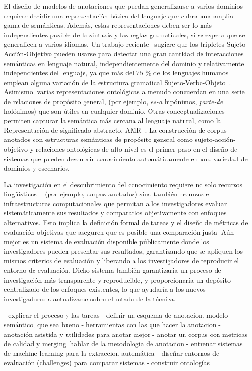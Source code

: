El diseño de modelos de anotaciones que puedan generalizarse a varios dominios requiere decidir una representación básica del lenguaje que cubra una amplia gama de semánticas.
Además, estas representaciones deben ser lo más independientes posible de la sintaxis y las reglas gramaticales, si se espera que se generalicen a varios idiomas.
Un trabajo reciente~\cite{estevez2018gathering} sugiere que los tripletes Sujeto-Acción-Objetivo pueden usarse para detectar una gran cantidad de interacciones semánticas en lenguaje natural, independientemente del dominio y relativamente independientes del lenguaje, ya que
más del 75 \% de los lenguajes humanos emplean alguna variación de la estructura gramatical Sujeto-Verbo-Objeto~\cite{crystal2004cambridge}.
Asimismo, varias representaciones ontológicas a menudo concuerdan en una serie de relaciones de propósito general, (por ejemplo, \textit{es-a} hipónimos, \textit{parte-de} holónimos) que son útiles en cualquier dominio.
Otras conceptualizaciones permiten capturar la semántica más cercana al lenguaje natural, como la Representación de significado abstracto, AMR~\cite{banarescu2013abstract}.
La construcción de corpus anotados con estructuras semánticas de propósito general como sujeto-acción-objetivo y relaciones ontológicas de alto nivel es el primer paso en el diseño de sistemas que pueden descubrir conocimiento automáticamente en una variedad de dominios y escenarios.

La investigación en el descubrimiento del conocimiento requiere no solo recursos lingüísticos ~ (por ejemplo, corpus anotados) sino también recursos e infraestructuras computacionales que permitan a los investigadores evaluar sistemáticamente sus resultados y compararlos objetivamente con enfoques alternativos.
Esto implica la definición formal de tareas y el diseño de métricas de evaluación objetivas que aseguren que es posible una comparación justa.
Aún mejor es un sistema de evaluación disponible públicamente donde los investigadores pueden presentar sus resultados, garantizando que se apliquen los mismos criterios de evaluación y liberando a los investigadores de reproducir el entorno de evaluación. Dicho sistema también garantizaría un proceso de investigación más transparente y reproducible, y proporcionaría un depósito centralizado de los enfoques existentes, lo que ayudaría a los nuevos investigadores a actualizarse sobre el estado de la técnica.


- explicar el proceso y las tareas
  - definir un esquema de anotacion, modelo semántico, que sea bueno
  - herramientas con las que hacer la anotacion
  - anotación asistida y utilidades para anotar mejor
  - anotar un corpus con metricas de calidad y merging, hablar de la metodologia de anotacion
  - entrenar sistemas de machine learning para la extraccion automática
  - diseñar entornos de evaluación (challenges) para comparar sistemas
  - construir ontologías

